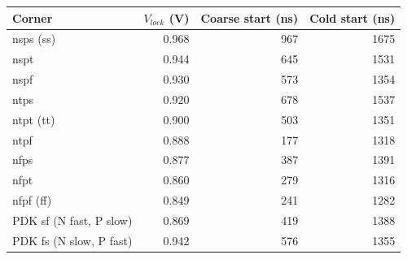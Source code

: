 \begin{tabular}{lrrr}\toprule
Corner & $V_{lock}$ (V) & Coarse start (ns) & Cold start (ns) \\\midrule
nsps (ss) & 0.968 & 967 & 1675 \\
nspt & 0.944 & 645 & 1531 \\
nspf & 0.930 & 573 & 1354 \\
ntps & 0.920 & 678 & 1537 \\
ntpt (tt) & 0.900 & 503 & 1351 \\
ntpf & 0.888 & 177 & 1318 \\
nfps & 0.877 & 387 & 1391 \\
nfpt & 0.860 & 279 & 1316 \\
nfpf (ff) & 0.849 & 241 & 1282 \\
PDK sf (N fast, P slow) & 0.869 & 419 & 1388 \\
PDK fs (N slow, P fast) & 0.942 & 576 & 1355 \\
\bottomrule\end{tabular}
